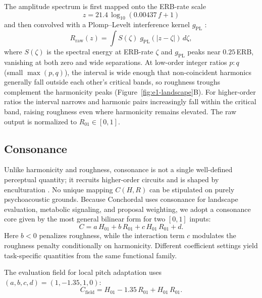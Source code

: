 \documentclass[letterpaper]{article}
\begin{document}
The amplitude spectrum is first mapped onto the ERB-rate scale
%
\begin{equation}
  z = 21.4\,\log_{10}(0.00437\,f+1)
  \label{eq:erb}
\end{equation}
%
and then convolved with a Plomp--Levelt interference kernel $g_{\mathrm{PL}}$ \citep{sethares1993}:
%
\begin{equation}
  R_{\mathrm{raw}}(z) = \int S(\zeta)\;g_{\mathrm{PL}}(|z-\zeta|)
      \,d\zeta,
  \label{eq:roughness}
\end{equation}
%
where $S(\zeta)$ is the spectral energy at ERB-rate $\zeta$ and $g_{\mathrm{PL}}$ peaks near $0.25$\,ERB, vanishing at both zero and wide separations. At low-order integer ratios $p\!:\!q$ (small $\max(p,q)$), the interval is wide enough that non-coincident harmonics generally fall outside each other's critical bands, so roughness troughs complement the harmonicity peaks (Figure~\ref{fig:e1-landscape}B). For higher-order ratios the interval narrows and harmonic pairs increasingly fall within the critical band, raising roughness even where harmonicity remains elevated. The raw output is normalized to $R_{01}\in[0,1]$.

\subsection{Consonance}

Unlike harmonicity and roughness, consonance is not a single well-defined perceptual quantity; it recruits higher-order circuits and is shaped by enculturation \citep{mcdermott2016}. No unique mapping $C(H,R)$ can be stipulated on purely psychoacoustic grounds. Because Conchordal uses consonance for landscape evaluation, metabolic signaling, and proposal weighting, we adopt a consonance core given by the most general bilinear form for two $[0,1]$ inputs:
%
\begin{equation}
C = a\,H_{01} + b\,R_{01} + c\,H_{01}\,R_{01} + d.
\label{eq:consonance-core}
\end{equation}
%
Here $b<0$ penalizes roughness, while the interaction term $c$ modulates the roughness penalty conditionally on harmonicity. Different coefficient settings yield task-specific quantities from the same functional family.

The evaluation field for local pitch adaptation uses $(a,b,c,d)=(1,-1.35,1,0)$:
\begin{equation}
C_{\text{field}} = H_{01} - 1.35\,R_{01} + H_{01}\,R_{01}.
\end{equation}
\end{document}
